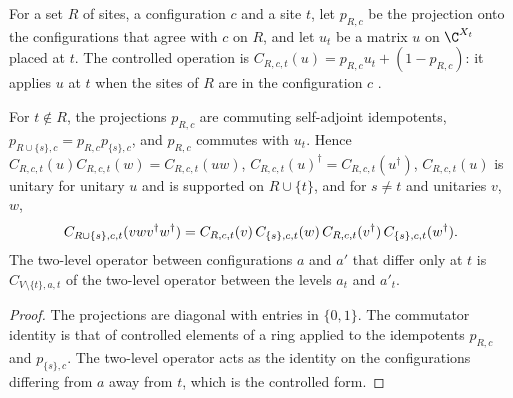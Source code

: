 \begin{definition}
    \label{def:unitary_ctrl_op}
    \leanok
    For a set $R$ of sites, a configuration $c$ and a site $t$, let $p_{R,c}$ be the
    projection onto the configurations that agree with $c$ on $R$, and let $u_t$ be a matrix
    $u$ on $\C^{X_t}$ placed at $t$. The controlled operation is
    $C_{R,c,t}(u)=p_{R,c}u_t+(1-p_{R,c})$: it applies $u$ at $t$ when the sites of $R$ are in
    the configuration $c$ \cite{Malz2024Preparation}.
\end{definition}

\begin{lemma}
    \label{lem:unitary_ctrl_op_algebra}
    \leanok
    For $t\notin R$, the projections $p_{R,c}$ are commuting self-adjoint idempotents,
    $p_{R\cup\{s\},c}=p_{R,c}p_{\{s\},c}$, and $p_{R,c}$ commutes with $u_t$. Hence
    $C_{R,c,t}(u)C_{R,c,t}(w)=C_{R,c,t}(uw)$, $C_{R,c,t}(u)^\dagger=C_{R,c,t}(u^\dagger)$,
    $C_{R,c,t}(u)$ is unitary for unitary $u$ and is supported on $R\cup\{t\}$, and for
    $s\ne t$ and unitaries $v$, $w$,
    \begin{align}
        C_{R\cup\{s\},c,t}(vwv^\dagger w^\dagger)
        =C_{R,c,t}(v)\,C_{\{s\},c,t}(w)\,C_{R,c,t}(v^\dagger)\,C_{\{s\},c,t}(w^\dagger).
        \notag
    \end{align}
    The two-level operator between configurations $a$ and $a'$ that differ only at $t$ is
    $C_{V\setminus\{t\},a,t}$ of the two-level operator between the levels $a_t$ and $a'_t$.
\end{lemma}
\begin{proof}\leanok
    The projections are diagonal with entries in $\{0,1\}$. The commutator identity is that of
    controlled elements of a ring applied to the idempotents $p_{R,c}$ and $p_{\{s\},c}$. The
    two-level operator acts as the identity on the configurations differing from $a$ away
    from $t$, which is the controlled form.
\end{proof}

